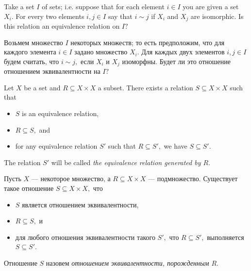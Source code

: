 \documentclass[../main/CT4S-EN-RU]{subfiles}
\begin{document}
\begin{exerciseENG}
Take a set $I$ of sets; i.e. suppose that for each element $i\in I$ you are given a set $X_i.$ For every two elements $i,j\in I$ say that $i\sim j$ if $X_i$ and $X_j$ are isomorphic. Is this relation an equivalence relation on $I?$  
\end{exerciseENG}

\begin{exerciseRUS}
Возьмем множество $I$ некоторых множеств; то есть предположим, что для каждого элемента $i\in I$ задано множество $X_i.$ Для каждых двух элементов $i,j\in I$ будем считать, что $i\sim j,$ если $X_i$ и $X_j$ изоморфны. Будет ли это отношение отношением эквивалентности на $I?$
\end{exerciseRUS}

\begin{lemmaENG}\label{lemma:generating ERs}
Let $X$ be a set and $R\subseteq X\times X$ a subset. There exists a relation $S\subseteq X\times X$ such that
\begin{itemize}
\item $S$ is an equivalence relation,
\item $R\subseteq S,$ and
\item for any equivalence relation $S'$ such that $R\subseteq S',$ we have $S\subseteq S'.$
\end{itemize}
The relation $S'$ will be called {\em the equivalence relation generated by $R$}.
\end{lemmaENG}

\begin{lemmaRUS}\label{lemma:generating ERs}
Пусть $X$ — некоторое множество, а $R\subseteq X\times X$ — подмножество. Существует такое отношение $S\subseteq X\times X,$ что
\begin{itemize}
\item $S$ является отношением эквивалентности,
\item $R\subseteq S,$ и
\item для любого отношения эквивалентности такого $S',$ что $R\subseteq S',$ выполняется $S\subseteq S'.$
\end{itemize}
Отношение $S$ назовем {\em отношением эквивалентности, порожденным $R$}.
\end{lemmaRUS}
\end{document}
